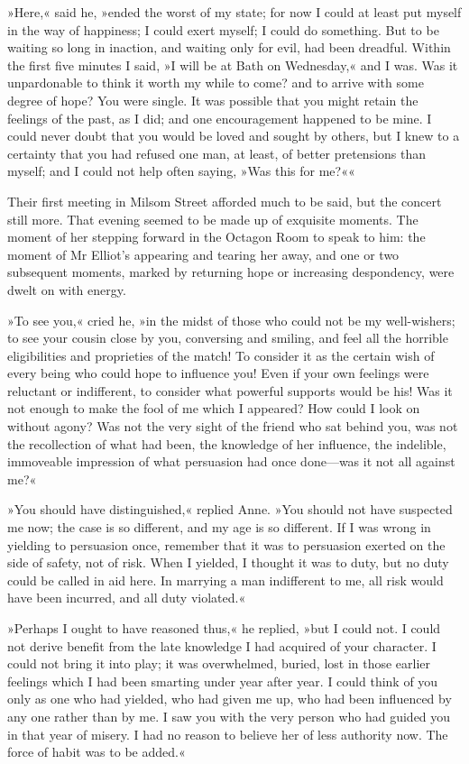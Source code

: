 »Here,« said he, »ended the worst of my state; for now I could at least put myself in the way of happiness; I could exert myself; I could do something. But to be waiting so long in inaction, and waiting only for evil, had been dreadful. Within the first five minutes I said, »I will be at Bath on Wednesday,« and I was. Was it unpardonable to think it worth my while to come? and to arrive with some degree of hope? You were single. It was possible that you might retain the feelings of the past, as I did; and one encouragement happened to be mine. I could never doubt that you would be loved and sought by others, but I knew to a certainty that you had refused one man, at least, of better pretensions than myself; and I could not help often saying, »Was this for me?««

Their first meeting in Milsom Street afforded much to be said, but the concert still more. That evening seemed to be made up of exquisite moments. The moment of her stepping forward in the Octagon Room to speak to him: the moment of Mr Elliot's appearing and tearing her away, and one or two subsequent moments, marked by returning hope or increasing despondency, were dwelt on with energy.

»To see you,« cried he, »in the midst of those who could not be my well-wishers; to see your cousin close by you, conversing and smiling, and feel all the horrible eligibilities and proprieties of the match! To consider it as the certain wish of every being who could hope to influence you! Even if your own feelings were reluctant or indifferent, to consider what powerful supports would be his! Was it not enough to make the fool of me which I appeared? How could I look on without agony? Was not the very sight of the friend who sat behind you, was not the recollection of what had been, the knowledge of her influence, the indelible, immoveable impression of what persuasion had once done—was it not all against me?«

»You should have distinguished,« replied Anne. »You should not have suspected me now; the case is so different, and my age is so different. If I was wrong in yielding to persuasion once, remember that it was to persuasion exerted on the side of safety, not of risk. When I yielded, I thought it was to duty, but no duty could be called in aid here. In marrying a man indifferent to me, all risk would have been incurred, and all duty violated.«

»Perhaps I ought to have reasoned thus,« he replied, »but I could not. I could not derive benefit from the late knowledge I had acquired of your character. I could not bring it into play; it was overwhelmed, buried, lost in those earlier feelings which I had been smarting under year after year. I could think of you only as one who had yielded, who had given me up, who had been influenced by any one rather than by me. I saw you with the very person who had guided you in that year of misery. I had no reason to believe her of less authority now. The force of habit was to be added.«

